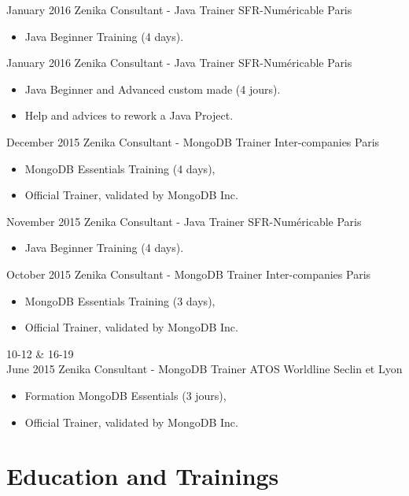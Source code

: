 \documentclass[11pt,a4paper]{moderncv}
\begin{document}
\cventry
{January 2016}
{Zenika Consultant - Java Trainer}
{SFR-Numéricable}
{Paris}
{}
{\begin{itemize}
\item Java Beginner Training (4 days).
\end{itemize}
}   %

\cventry
{January 2016}
{Zenika Consultant - Java Trainer}
{SFR-Numéricable}
{Paris}
{}
{\begin{itemize}
\item Java Beginner and Advanced custom made (4 jours).
\item Help and advices to rework a Java Project.
\end{itemize}
}   %

\cventry
{December 2015}
{Zenika Consultant - MongoDB Trainer}
{Inter-companies}
{Paris}
{}
{\begin{itemize}
\item MongoDB Essentials Training (4 days),
\item Official Trainer, validated by MongoDB Inc.
\end{itemize}
}   %

\cventry
{November 2015}
{Zenika Consultant - Java Trainer}
{SFR-Numéricable}
{Paris}
{}
{\begin{itemize}
\item Java Beginner Training (4 days).
\end{itemize}
}   %

\cventry
{October 2015}
{Zenika Consultant - MongoDB Trainer}
{Inter-companies}
{Paris}
{}
{\begin{itemize}
\item MongoDB Essentials Training (3 days),
\item Official Trainer, validated by MongoDB Inc.
\end{itemize}
}   %

\cventry
{10-12 \& 16-19\\ June 2015}
{Zenika Consultant - MongoDB Trainer}
{ATOS Worldline}
{Seclin et Lyon}
{}
{\begin{itemize}
\item Formation MongoDB Essentials (3 jours),
\item Official Trainer, validated by MongoDB Inc.
\end{itemize}
}   %

\section{Education and Trainings}
\end{document}
